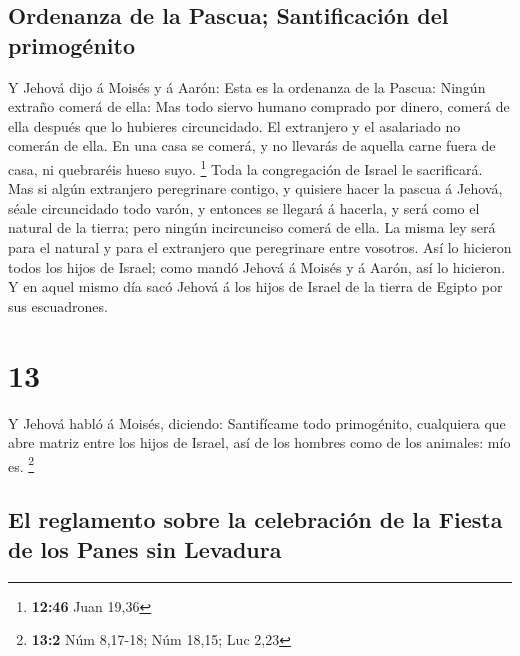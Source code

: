\hypertarget{ordenanza-de-la-pascua-santificaciuxf3n-del-primoguxe9nito}{%
\subsection{Ordenanza de la Pascua; Santificación del
primogénito}\label{ordenanza-de-la-pascua-santificaciuxf3n-del-primoguxe9nito}}

 Y Jehová dijo á Moisés y á Aarón: Esta es la ordenanza
de la Pascua: Ningún extraño comerá de ella:  Mas todo
siervo humano comprado por dinero, comerá de ella después que lo
hubieres circuncidado.  El extranjero y el asalariado no
comerán de ella.  En una casa se comerá, y no llevarás de
aquella carne fuera de casa, ni quebraréis hueso suyo. \footnote{\textbf{12:46}
  Juan 19,36}  Toda la congregación de Israel le
sacrificará.  Mas si algún extranjero peregrinare
contigo, y quisiere hacer la pascua á Jehová, séale circuncidado todo
varón, y entonces se llegará á hacerla, y será como el natural de la
tierra; pero ningún incircunciso comerá de ella.  La
misma ley será para el natural y para el extranjero que peregrinare
entre vosotros.  Así lo hicieron todos los hijos de
Israel; como mandó Jehová á Moisés y á Aarón, así lo hicieron.
 Y en aquel mismo día sacó Jehová á los hijos de Israel
de la tierra de Egipto por sus escuadrones.

\hypertarget{section-12}{%
\section{13}\label{section-12}}

 Y Jehová habló á Moisés, diciendo: 
Santifícame todo primogénito, cualquiera que abre matriz entre los hijos
de Israel, así de los hombres como de los animales: mío es. \footnote{\textbf{13:2}
  Núm 8,17-18; Núm 18,15; Luc 2,23}

\hypertarget{el-reglamento-sobre-la-celebraciuxf3n-de-la-fiesta-de-los-panes-sin-levadura}{%
\subsection{El reglamento sobre la celebración de la Fiesta de los Panes
sin
Levadura}\label{el-reglamento-sobre-la-celebraciuxf3n-de-la-fiesta-de-los-panes-sin-levadura}}

